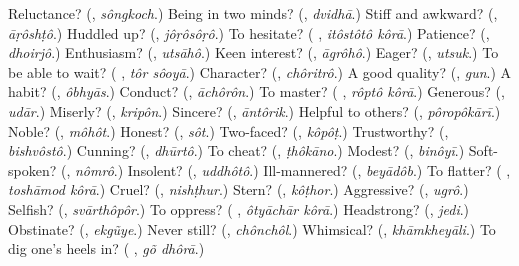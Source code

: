 \begin{tcolorbox}[breakable,colback=teal!4,colframe=teal!35!black,title={Before you move on}]
Reluctance? (\textbf{}, \emph{sôngkoch}.) Being in two minds? (\textbf{}, \emph{dvidhā}.) Stiff and awkward? (\textbf{}, \emph{āṛôshṭô}.) Huddled up? (\textbf{}, \emph{jôṛôsôṛô}.) To hesitate? (\textbf{ }, \emph{itôstôtô kôrā}.) Patience? (\textbf{}, \emph{dhoirjô}.) Enthusiasm? (\textbf{}, \emph{utsāhô}.) Keen interest? (\textbf{}, \emph{āgrôhô}.) Eager? (\textbf{}, \emph{utsuk}.) To be able to wait? (\textbf{ }, \emph{tôr sôoyā}.) Character? (\textbf{}, \emph{chôritrô}.) A good quality? (\textbf{}, \emph{gun}.) A habit? (\textbf{}, \emph{ôbhyās}.) Conduct? (\textbf{}, \emph{āchôrôn}.) To master? (\textbf{ }, \emph{rôptô kôrā}.) Generous? (\textbf{}, \emph{udār}.) Miserly? (\textbf{}, \emph{kripôn}.) Sincere? (\textbf{}, \emph{āntôrik}.) Helpful to others? (\textbf{}, \emph{pôropôkārī}.) Noble? (\textbf{}, \emph{môhôt}.) Honest? (\textbf{}, \emph{sôt}.) Two-faced? (\textbf{}, \emph{kôpôṭ}.) Trustworthy? (\textbf{}, \emph{bishvôstô}.) Cunning? (\textbf{}, \emph{dhūrtô}.) To cheat? (\textbf{}, \emph{ṭhôkāno}.) Modest? (\textbf{}, \emph{binôyī}.) Soft-spoken? (\textbf{}, \emph{nômrô}.) Insolent? (\textbf{}, \emph{uddhôtô}.) Ill-mannered? (\textbf{}, \emph{beyādôb}.) To flatter? (\textbf{ }, \emph{toshāmod kôrā}.) Cruel? (\textbf{}, \emph{nishṭhur}.) Stern? (\textbf{}, \emph{kôṭhor}.) Aggressive? (\textbf{}, \emph{ugrô}.) Selfish? (\textbf{}, \emph{svārthôpôr}.) To oppress? (\textbf{ }, \emph{ôtyāchār kôrā}.) Headstrong? (\textbf{}, \emph{jedi}.) Obstinate? (\textbf{}, \emph{ekgũye}.) Never still? (\textbf{}, \emph{chônchôl}.) Whimsical? (\textbf{}, \emph{khāmkheyāli}.) To dig one's heels in? (\textbf{ }, \emph{gõ dhôrā}.)
\end{tcolorbox}
